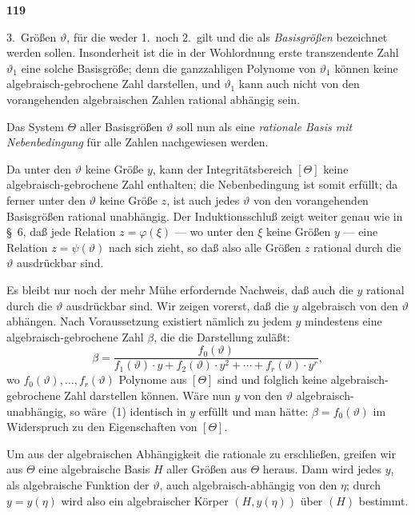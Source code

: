 \documentclass[12pt,a4paper]{article}
\begin{document}
\newpage
\begin{center}
\textbf{119}
\end{center}

3.\ Gr\"o\ss en $\vartheta$, f\"ur die weder 1.\ noch 2.\ gilt und die als \emph{Basisgr\"o\ss en} bezeichnet werden sollen. Insonderheit ist die in der Wohlordnung erste transzendente Zahl $\vartheta_1$ eine solche Basisgr\"o\ss e; denn die ganzzahligen Polynome von $\vartheta_1$ k\"onnen keine algebraisch-gebrochene Zahl darstellen, und $\vartheta_1$ kann auch nicht von den vorangehenden algebraischen Zahlen rational abh\"angig sein.

Das System $\Theta$ aller Basisgr\"o\ss en $\vartheta$ soll nun als eine \emph{rationale Basis mit Nebenbedingung} f\"ur alle Zahlen nachgewiesen werden.

Da unter den $\vartheta$ keine Gr\"o\ss e $y$, kann der Integrit\"atsbereich $[\Theta]$ keine algebraisch-gebrochene Zahl enthalten; die Nebenbedingung ist somit erf\"ullt; da ferner unter den $\vartheta$ keine Gr\"o\ss e $z$, ist auch jedes $\vartheta$ von den vorangehenden Basisgr\"o\ss en rational unabh\"angig. Der Induktionsschlu\ss{} zeigt weiter genau wie in \S\ 6, da\ss{} jede Relation $z = \varphi(\xi)$ --- wo unter den $\xi$ keine Gr\"o\ss en $y$ --- eine Relation $z = \psi(\vartheta)$ nach sich zieht, so da\ss{} also alle Gr\"o\ss en $z$ rational durch die $\vartheta$ ausdr\"uckbar sind.

Es bleibt nur noch der mehr M\"uhe erfordernde Nachweis, da\ss{} auch die $y$ rational durch die $\vartheta$ ausdr\"uckbar sind. Wir zeigen vorerst, da\ss{} die $y$ algebraisch von den $\vartheta$ abh\"angen. Nach Voraussetzung existiert n\"amlich zu jedem $y$ mindestens eine algebraisch-gebrochene Zahl $\beta$, die die Darstellung zul\"a\ss t:
\begin{equation}\tag{1}
\beta = \frac{f_0(\vartheta)}{f_1(\vartheta) \cdot y + f_2(\vartheta) \cdot y^2 + \cdots + f_r(\vartheta) \cdot y^r},
\end{equation}
wo $f_0(\vartheta), \ldots, f_r(\vartheta)$ Polynome aus $[\Theta]$ sind und folglich keine algebraisch-gebrochene Zahl darstellen k\"onnen. W\"are nun $y$ von den $\vartheta$ algebraisch-unabh\"angig, so w\"are~(1) identisch in $y$ erf\"ullt und man h\"atte: $\beta = f_0(\vartheta)$ im Widerspruch zu den Eigenschaften von $[\Theta]$.

Um aus der algebraischen Abh\"angigkeit die rationale zu erschlie\ss en, greifen wir aus $\Theta$ eine algebraische Basis $H$ aller Gr\"o\ss en aus $\Theta$ heraus. Dann wird jedes $y$, als algebraische Funktion der $\vartheta$, auch algebraisch-abh\"angig von den $\eta$; durch $y = y(\eta)$ wird also ein algebraischer K\"orper $(H, y(\eta))$ \"uber $(H)$ bestimmt.
\end{document}
